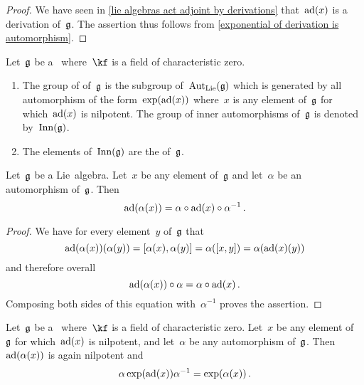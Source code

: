 \begin{proof}
  We have seen in \cref{lie algebras act adjoint by derivations} that~$\operatorname{ad}(x)$ is a derivation of~$\mathfrak{g}$.
  The assertion thus follows from \cref{exponential of derivation is automorphism}.
\end{proof}


\begin{definition}
  Let~$\mathfrak{g}$ be a~\liealgebra{$\kf$} where~$\kf$ is a field of characteristic zero.
  \begin{enumerate}
    \item
      The group of  of~$\mathfrak{g}$ is the subgroup of~$\operatorname{Aut}_{\mathrm{Lie}}(\mathfrak{g})$ which is generated by all automorphism of the form~$\exp(\operatorname{ad}(x))$ where~$x$ is any element of~$\mathfrak{g}$ for which~$\operatorname{ad}(x)$ is nilpotent.
      The group of inner automorphisms of~$\mathfrak{g}$ is denoted by~$\operatorname{Inn}(\mathfrak{g})$.
    \item
      The elements of~$\operatorname{Inn}(\mathfrak{g})$ are the  of~$\mathfrak{g}$.
  \end{enumerate}
\end{definition}


\begin{lemma}
  \label{adjoint and automorphisms}
  Let~$\mathfrak{g}$ be a Lie~algebra.
  Let~$x$ be any element of~$\mathfrak{g}$ and let~$\alpha$ be an automorphism of~$\mathfrak{g}$.
  Then
  \[
    \operatorname{ad}(\alpha(x))
    =
    \alpha \circ \operatorname{ad}(x) \circ \alpha^{-1} \,.
  \]
\end{lemma}


\begin{proof}
  We have for every element~$y$ of~$\mathfrak{g}$ that
  \[
    \operatorname{ad}(\alpha(x))(\alpha(y))
    =
    [\alpha(x), \alpha(y)]
    =
    \alpha( [x,y] )
    =
    \alpha( \operatorname{ad}(x)(y) )
  \]
  and therefore overall
  \[
    \operatorname{ad}(\alpha(x)) \circ \alpha
    =
    \alpha \circ \operatorname{ad}(x) \,.
  \]
  Composing both sides of this equation with~$\alpha^{-1}$ proves the assertion.
\end{proof}


\begin{lemma}
  \label{conjugation of inner automorphism}
  Let~$\mathfrak{g}$ be a~\liealgebra{$\kf$} where~$\kf$ is a field of characteristic zero.
  Let~$x$ be any element of~$\mathfrak{g}$ for which~$\operatorname{ad}(x)$ is nilpotent, and let~$\alpha$ be any automorphism of~$\mathfrak{g}$.
  Then~$\operatorname{ad}(\alpha(x))$ is again nilpotent and
  \[
    \alpha \exp(\operatorname{ad}(x)) \alpha^{-1}
    =
    \exp( \alpha(x) ) \,.
  \]
\end{lemma}


